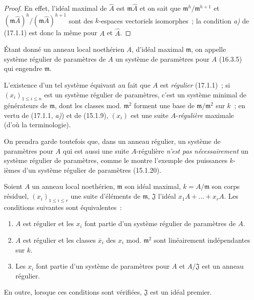 \begin{proof}
En effet, l'idéal maximal de $\widehat{A}$ est $\mathfrak{m}\widehat{A}$ et on
sait que $\mathfrak{m}^h/\mathfrak{m}^{h+1}$ et
$(\mathfrak{m}\widehat{A})^h/(\mathfrak{m}\widehat{A})^{h+1}$ sont des
$k$-espaces vectoriels isomorphes~; la condition \emph{a)} de (17.1.1) est donc la
même pour $A$ et $\widehat{A}$.
\end{proof}

\begin{definition}[17.1.6]
\label{0.17.1.6-fr}
Étant donné un anneau local noethérien $A$, d'idéal maximal $\mathfrak{m}$, on
appelle système régulier de paramètres de $A$ un système de paramètres
pour $A$ \textup{(16.3.5)} qui engendre $\mathfrak{m}$.
\end{definition}

L'existence d'un tel système équivaut au fait que $A$ est \emph{régulier} (17.1.1)~;
si $(x_i)_{1\leq i\leq n}$ est un système régulier de paramètres, c'est un
système minimal de générateurs de $\mathfrak{m}$, dont les classes mod.
$\mathfrak{m}^2$ forment une base de $\mathfrak{m}/\mathfrak{m}^2$ sur $k$~;
en vertu de (17.1.1, \emph{a)}) et de (15.1.9), $(x_i)$ est une suite $A$-\emph{régulière}
maximale (d'où la terminologie).

On prendra garde toutefois que, dans un anneau régulier, un système de
paramètres pour $A$ qui est aussi une suite $A$-régulière \emph{n'est pas
nécessairement} un système régulier de paramètres, comme le montre l'exemple
des puissances $k$-ièmes d'un système régulier de paramètres (15.1.20).

\begin{proposition}[17.1.7]
\label{0.17.1.7-fr}
Soient $A$ un anneau local noethérien, $\mathfrak{m}$ son idéal maximal,
$k=A/\mathfrak{m}$ son corps résiduel, $(x_i)_{1\leq i\leq r}$ une suite
d'éléments de $\mathfrak{m}$, $\mathfrak{J}$ l'idéal
$x_1A+\ldots+x_rA$. Les conditions suivantes sont équivalentes~:
\begin{enumerate}
  \item[\rm a)] $A$ est régulier et les $x_i$ font partie d'un système
  régulier de paramètres de $A$.
  \item[\rm a')] $A$ est régulier et les classes $\overline{x}_i$ des $x_i$
  \textup{mod.} $\mathfrak{m}^2$ sont linéairement indépendantes sur $k$.
  \item[\rm b)] Les $x_i$ font partie d'un système de paramètres pour $A$ et
  $A/\mathfrak{J}$ est un anneau régulier.
\end{enumerate}
En outre, lorsque ces conditions sont vérifiées, $\mathfrak{J}$ est un idéal
premier.
\end{proposition}

